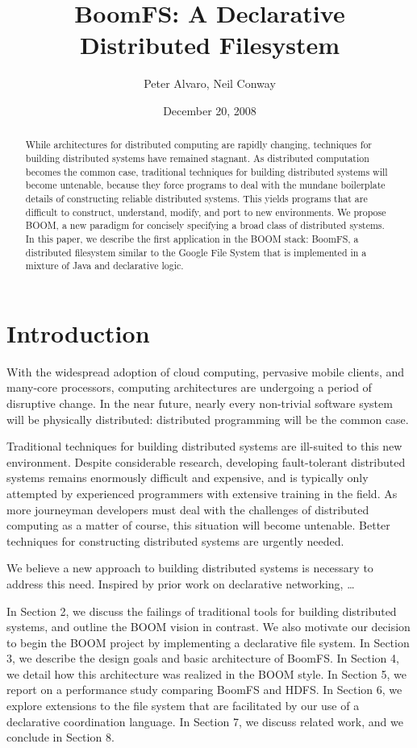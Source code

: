 \documentclass{article}
\title{BoomFS: A Declarative Distributed Filesystem}
\author{Peter Alvaro, Neil Conway}
\date{December 20, 2008}
\begin{document}
\maketitle
\begin{abstract}
  While architectures for distributed computing are rapidly changing,
  techniques for building distributed systems have remained
  stagnant. As distributed computation becomes the common case,
  traditional techniques for building distributed systems will become
  untenable, because they force programs to deal with the mundane
  boilerplate details of constructing reliable distributed
  systems. This yields programs that are difficult to construct,
  understand, modify, and port to new environments. We propose BOOM, a
  new paradigm for concisely specifying a broad class of distributed
  systems. In this paper, we describe the first application in the
  BOOM stack: BoomFS, a distributed filesystem similar to the Google
  File System\cite{gfs} that is implemented in a mixture of Java and
  declarative logic.
\end{abstract}

\section{Introduction}
With the widespread adoption of cloud computing, pervasive mobile
clients, and many-core processors, computing architectures are
undergoing a period of disruptive change. In the near future, nearly
every non-trivial software system will be physically distributed:
distributed programming will be the common case.

Traditional techniques for building distributed systems are ill-suited
to this new environment. Despite considerable research, developing
fault-tolerant distributed systems remains enormously difficult and
expensive, and is typically only attempted by experienced programmers
with extensive training in the field. As more journeyman developers
must deal with the challenges of distributed computing as a matter of
course, this situation will become untenable. Better techniques for
constructing distributed systems are urgently needed.

We believe a new approach to building distributed systems is necessary
to address this need. Inspired by prior work on declarative
networking, \ldots

In Section 2, we discuss the failings of traditional tools for
building distributed systems, and outline the BOOM vision in
contrast. We also motivate our decision to begin the BOOM project by
implementing a declarative file system. In Section 3, we describe the
design goals and basic architecture of BoomFS. In Section 4, we detail
how this architecture was realized in the BOOM style. In Section 5, we
report on a performance study comparing BoomFS and HDFS\cite{}. In
Section 6, we explore extensions to the file system that are
facilitated by our use of a declarative coordination language. In
Section 7, we discuss related work, and we conclude in Section 8.
\end{document}

